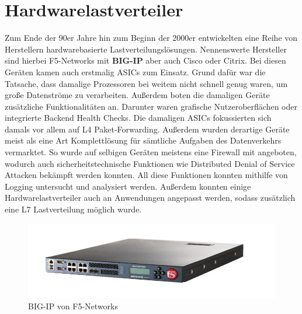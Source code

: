 \section{Hardwarelastverteiler}
Zum Ende der 90er Jahre hin zum Beginn der 2000er entwickelten eine Reihe von Herstellern hardwarebasierte Lastverteilungslösungen. Nennenswerte Hersteller sind hierbei F5-Networks mit \textbf{BIG-IP} aber auch Cisco oder Citrix. Bei diesen Geräten kamen auch erstmalig ASICs zum Einsatz. Grund dafür war die Tatsache, dass damalige Prozessoren bei weitem nicht schnell genug waren, um große Datenströme zu verarbeiten. Außerdem boten die damaligen Geräte zusätzliche Funktionalitäten an. Darunter waren grafische Nutzeroberflächen oder integrierte Backend Health Checks. Die damaligen ASICs fokussierten sich damals vor allem auf L4 Paket-Forwarding. Außerdem wurden derartige Geräte meist als eine Art Komplettlösung für sämtliche Aufgaben des Datenverkehrs vermarktet. So wurde auf selbigen Geräten meistens eine Firewall mit angeboten, wodurch auch sicherheitstechnische Funktionen wie Distributed Denial of Service Attacken bekämpft werden konnten. All diese Funktionen konnten mithilfe von Logging untersucht und analysiert werden. Außerdem konnten einige Hardwarelastverteiler auch an Anwendungen angepasst werden, sodass zusätzlich eine L7 Lastverteilung möglich wurde.
\begin{figure}
    \centering
    \includegraphics[width=1\linewidth]{images/s-l1600.jpg}
    \caption{BIG-IP von F5-Networks}
    \label{fig:enter-label}
\end{figure}
